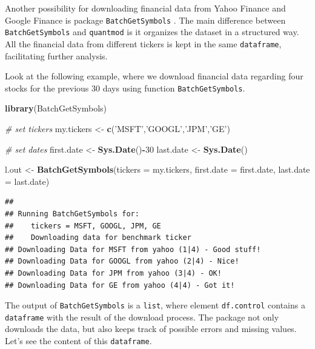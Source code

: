\documentclass[11pt,]{book}
\newenvironment{Shaded}{\begin{snugshade}}{\end{snugshade}}
\newcommand{\KeywordTok}[1]{\textcolor[rgb]{0.27,0.27,0.27}{\textbf{#1}}}
\newcommand{\DataTypeTok}[1]{\textcolor[rgb]{0.27,0.27,0.27}{#1}}
\newcommand{\DecValTok}[1]{\textcolor[rgb]{0.06,0.06,0.06}{#1}}
\newcommand{\StringTok}[1]{\textcolor[rgb]{0.5,0.5,0.5}{#1}}
\newcommand{\CommentTok}[1]{\textcolor[rgb]{0.56,0.35,0.01}{\textit{#1}}}
\newcommand{\OperatorTok}[1]{\textcolor[rgb]{0.81,0.36,0.00}{\textbf{#1}}}
\newcommand{\NormalTok}[1]{#1}
\begin{document}
Another possibility for downloading financial data from Yahoo Finance
and Google Finance is package \texttt{BatchGetSymbols}
\citep{BatchGetSymbols}. The main difference between
\texttt{BatchGetSymbols} and \texttt{quantmod} is it organizes the
dataset in a structured way. All the financial data from different
tickers is kept in the same \texttt{dataframe}, facilitating further
analysis. 

Look at the following example, where we download financial data
regarding four stocks for the previous 30 days using function
\texttt{BatchGetSymbols}. 

\begin{Shaded}
\begin{Highlighting}[]
\KeywordTok{library}\NormalTok{(BatchGetSymbols)}

\CommentTok{# set tickers}
\NormalTok{my.tickers <-}\StringTok{ }\KeywordTok{c}\NormalTok{(}\StringTok{'MSFT'}\NormalTok{,}\StringTok{'GOOGL'}\NormalTok{,}\StringTok{'JPM'}\NormalTok{,}\StringTok{'GE'}\NormalTok{)}

\CommentTok{# set dates}
\NormalTok{first.date <-}\StringTok{ }\KeywordTok{Sys.Date}\NormalTok{()}\OperatorTok{-}\DecValTok{30}
\NormalTok{last.date <-}\StringTok{ }\KeywordTok{Sys.Date}\NormalTok{()}

\NormalTok{l.out <-}\StringTok{ }\KeywordTok{BatchGetSymbols}\NormalTok{(}\DataTypeTok{tickers =}\NormalTok{ my.tickers,}
                         \DataTypeTok{first.date =}\NormalTok{ first.date,}
                         \DataTypeTok{last.date =}\NormalTok{ last.date)}
\end{Highlighting}
\end{Shaded}

\begin{verbatim}
## 
## Running BatchGetSymbols for:
##    tickers = MSFT, GOOGL, JPM, GE
##    Downloading data for benchmark ticker
## Downloading Data for MSFT from yahoo (1|4) - Good stuff!
## Downloading Data for GOOGL from yahoo (2|4) - Nice!
## Downloading Data for JPM from yahoo (3|4) - OK!
## Downloading Data for GE from yahoo (4|4) - Got it!
\end{verbatim}

The output of \texttt{BatchGetSymbols} is a \texttt{list}, where element
\texttt{df.control} contains a \texttt{dataframe} with the result of the
download process. The package not only downloads the data, but also
keeps track of possible errors and missing values. Let's see the content
of this \texttt{dataframe}.
\end{document}
